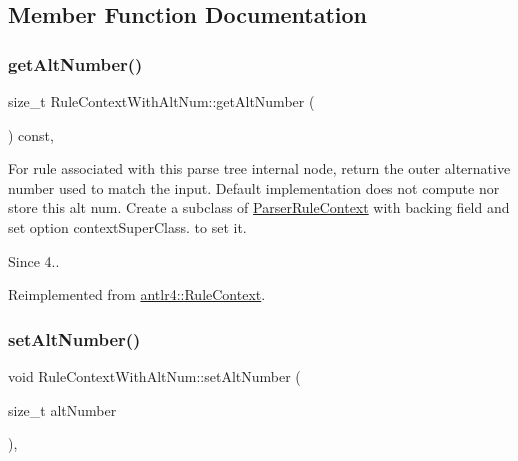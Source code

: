 \subsection{Member Function Documentation}
\mbox{\label{classantlr4_1_1RuleContextWithAltNum_a6efffe072fe42ba82c405545db4e5510}} 
\subsubsection{\texorpdfstring{get\+Alt\+Number()}{getAltNumber()}}
{\footnotesize\ttfamily size\+\_\+t Rule\+Context\+With\+Alt\+Num\+::get\+Alt\+Number (\begin{DoxyParamCaption}{ }\end{DoxyParamCaption}) const\hspace{0.3cm}{\ttfamily [override]}, {\ttfamily [virtual]}}

For rule associated with this parse tree internal node, return the outer alternative number used to match the input. Default implementation does not compute nor store this alt num. Create a subclass of \hyperlink{classantlr4_1_1ParserRuleContext}{Parser\+Rule\+Context} with backing field and set option context\+Super\+Class. to set it.

\begin{DoxySince}{Since}
4.. 
\end{DoxySince}


Reimplemented from \hyperlink{classantlr4_1_1RuleContext_abb31efff7ed16c524298b9052c75e8f7}{antlr4\+::\+Rule\+Context}.

\mbox{\label{classantlr4_1_1RuleContextWithAltNum_adf2d601a196a88f4f399ea5847f44151}} 
\subsubsection{\texorpdfstring{set\+Alt\+Number()}{setAltNumber()}}
{\footnotesize\ttfamily void Rule\+Context\+With\+Alt\+Num\+::set\+Alt\+Number (\begin{DoxyParamCaption}\item[{size\+\_\+t}]{alt\+Number }\end{DoxyParamCaption})\hspace{0.3cm}{\ttfamily [override]}, {\ttfamily [virtual]}}

